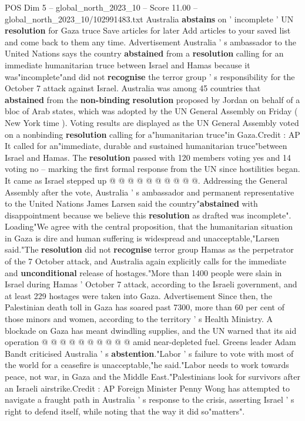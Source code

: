 \begin{textsample}{POS Dim 5 – global\_north\_2023\_10 – Score 11.00 – global\_north\_2023\_10/102991483.txt}  \label{ex:f5_pos_430}
Australia \textbf{abstains} on ' incomplete ' UN \textbf{resolution} for Gaza truce Save articles for later Add articles to your saved list and come back to them any time.
Advertisement Australia ' s ambassador to the United Nations says the country \textbf{abstained} from a \textbf{resolution} calling for an immediate humanitarian truce between Israel and Hamas because it was"incomplete"and did not \textbf{recognise} the terror group ' s responsibility for the October 7 attack against Israel.
Australia was among 45 countries that \textbf{abstained} from the \textbf{non-binding} \textbf{resolution} proposed by Jordan on behalf of a bloc of Arab states, which was adopted by the UN General Assembly on Friday ( New York time ).
Voting results are displayed as the UN General Assembly voted on a nonbinding \textbf{resolution} calling for a"humanitarian truce"in Gaza.Credit : AP It called for an"immediate, durable and sustained humanitarian truce"between Israel and Hamas.
The \textbf{resolution} passed with 120 members voting yes and 14 voting no -- marking the first formal response from the UN since hostilities began.
It came as Israel stepped up @ @ @ @ @ @ @ @ @ @.
Addressing the General Assembly after the vote, Australia ' s ambassador and permanent representative to the United Nations James Larsen said the country"\textbf{abstained} with disappointment because we believe this \textbf{resolution} as drafted was incomplete".
Loading"We agree with the central proposition, that the humanitarian situation in Gaza is dire and human suffering is widespread and unacceptable,"Larsen said."The \textbf{resolution} did not \textbf{recognise} terror group Hamas as the perpetrator of the 7 October attack, and Australia again explicitly calls for the immediate and \textbf{unconditional} release of hostages."More than 1400 people were slain in Israel during Hamas ' October 7 attack, according to the Israeli government, and at least 229 hostages were taken into Gaza.
Advertisement Since then, the Palestinian death toll in Gaza has soared past 7300, more than 60 per cent of those minors and women, according to the territory ' s Health Ministry.
A blockade on Gaza has meant dwindling supplies, and the UN warned that its aid operation @ @ @ @ @ @ @ @ @ @ amid near-depleted fuel.
Greens leader Adam Bandt criticised Australia ' s \textbf{abstention}."Labor ' s failure to vote with most of the world for a ceasefire is unacceptable,"he said."Labor needs to work towards peace, not war, in Gaza and the Middle East."Palestinians look for survivors after an Israeli airstrike.Credit : AP Foreign Minister Penny Wong has attempted to navigate a fraught path in Australia ' s response to the crisis, asserting Israel ' s right to defend itself, while noting that the way it did so"matters".

\end{textsample}
